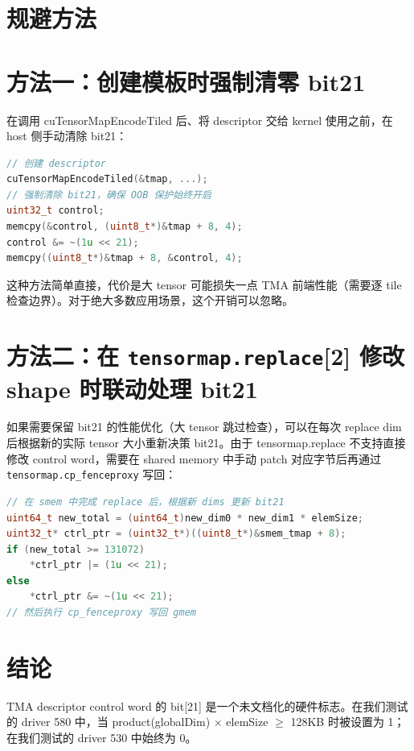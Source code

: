 \section{规避方法}

\section{方法一：创建模板时强制清零 bit21}

在调用 cuTensorMapEncodeTiled 后、将 descriptor 交给 kernel 使用之前，在 host 侧手动清除 bit21：

\begin{lstlisting}[language=C++]
// 创建 descriptor
cuTensorMapEncodeTiled(&tmap, ...);
// 强制清除 bit21，确保 OOB 保护始终开启
uint32_t control;
memcpy(&control, (uint8_t*)&tmap + 8, 4);
control &= ~(1u << 21);
memcpy((uint8_t*)&tmap + 8, &control, 4);
\end{lstlisting}

这种方法简单直接，代价是大 tensor 可能损失一点 TMA 前端性能（需要逐 tile 检查边界）。对于绝大多数应用场景，这个开销可以忽略。

\section{方法二：在 \texttt{tensormap.replace}[2] 修改 shape 时联动处理 bit21}

如果需要保留 bit21 的性能优化（大 tensor 跳过检查），可以在每次 replace dim 后根据新的实际 tensor 大小重新决策 bit21。由于 tensormap.replace 不支持直接修改 control word，需要在 shared memory 中手动 patch 对应字节后再通过 \lstinline|tensormap.cp_fenceproxy| 写回：

\begin{lstlisting}[language=C++]
// 在 smem 中完成 replace 后，根据新 dims 更新 bit21
uint64_t new_total = (uint64_t)new_dim0 * new_dim1 * elemSize;
uint32_t* ctrl_ptr = (uint32_t*)((uint8_t*)&smem_tmap + 8);
if (new_total >= 131072)
    *ctrl_ptr |= (1u << 21);
else
    *ctrl_ptr &= ~(1u << 21);
// 然后执行 cp_fenceproxy 写回 gmem
\end{lstlisting}

\section{结论}

TMA descriptor control word 的 bit[21] 是一个未文档化的硬件标志。在我们测试的 driver 580 中，当 product(globalDim) $\times$ elemSize $\geq$ 128KB 时被设置为 1；在我们测试的 driver 530 中始终为 0。


